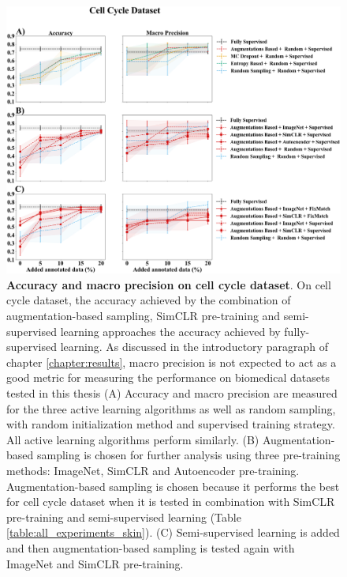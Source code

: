 \begin{figure}[htbp]
\centering
\captionsetup{format=plain}
\includegraphics[width=\textwidth]{figures/fig_2_cycle_acc_precision.png}
\caption[Accuracy and macro precision on cell cycle dataset]{\textbf{Accuracy and macro precision on cell cycle dataset}. On cell cycle dataset, the accuracy achieved by the combination of augmentation-based sampling, SimCLR pre-training and semi-supervised learning approaches the accuracy achieved by fully-supervised learning. As discussed in the introductory paragraph of chapter \ref{chapter:results}, macro precision is not expected to act as a good metric for measuring the performance on biomedical datasets tested in this thesis (A) Accuracy and macro precision are measured for the three active learning algorithms as well as random sampling, with random initialization method and supervised training strategy. All active learning algorithms perform similarly. (B) Augmentation-based sampling is chosen for further analysis using three pre-training methods: ImageNet, SimCLR and Autoencoder pre-training. Augmentation-based sampling is chosen because it performs the best for cell cycle dataset when it is tested in combination with SimCLR pre-training and semi-supervised learning (Table \ref{table:all_experiments_skin}). (C) Semi-supervised learning is added and then augmentation-based sampling is tested again with ImageNet and SimCLR pre-training.}
\label{fig:fig_2_cycle_acc_precision}
\end{figure}

